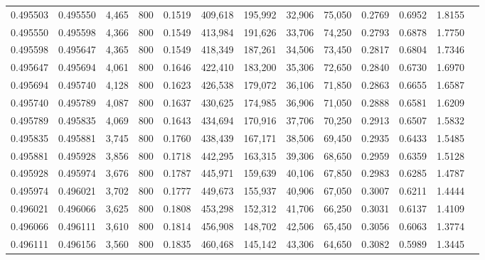 \begin{tabular}{rrrrrrrrrrrrr}
0.495503 & 0.495550 &  4,465 &   800 &                                     0.1519 & 409,618 & 195,992 &  32,906 &  75,050 & 0.2769 & 0.6952 & 1.8155 \\
0.495550 & 0.495598 &  4,366 &   800 &                                     0.1549 & 413,984 & 191,626 &  33,706 &  74,250 & 0.2793 & 0.6878 & 1.7750 \\
0.495598 & 0.495647 &  4,365 &   800 &                                     0.1549 & 418,349 & 187,261 &  34,506 &  73,450 & 0.2817 & 0.6804 & 1.7346 \\
0.495647 & 0.495694 &  4,061 &   800 &                                     0.1646 & 422,410 & 183,200 &  35,306 &  72,650 & 0.2840 & 0.6730 & 1.6970 \\
0.495694 & 0.495740 &  4,128 &   800 &                                     0.1623 & 426,538 & 179,072 &  36,106 &  71,850 & 0.2863 & 0.6655 & 1.6587 \\
0.495740 & 0.495789 &  4,087 &   800 &                                     0.1637 & 430,625 & 174,985 &  36,906 &  71,050 & 0.2888 & 0.6581 & 1.6209 \\
0.495789 & 0.495835 &  4,069 &   800 &                                     0.1643 & 434,694 & 170,916 &  37,706 &  70,250 & 0.2913 & 0.6507 & 1.5832 \\
0.495835 & 0.495881 &  3,745 &   800 &                                     0.1760 & 438,439 & 167,171 &  38,506 &  69,450 & 0.2935 & 0.6433 & 1.5485 \\
0.495881 & 0.495928 &  3,856 &   800 &                                     0.1718 & 442,295 & 163,315 &  39,306 &  68,650 & 0.2959 & 0.6359 & 1.5128 \\
0.495928 & 0.495974 &  3,676 &   800 &                                     0.1787 & 445,971 & 159,639 &  40,106 &  67,850 & 0.2983 & 0.6285 & 1.4787 \\
0.495974 & 0.496021 &  3,702 &   800 &                                     0.1777 & 449,673 & 155,937 &  40,906 &  67,050 & 0.3007 & 0.6211 & 1.4444 \\
0.496021 & 0.496066 &  3,625 &   800 &                                     0.1808 & 453,298 & 152,312 &  41,706 &  66,250 & 0.3031 & 0.6137 & 1.4109 \\
0.496066 & 0.496111 &  3,610 &   800 &                                     0.1814 & 456,908 & 148,702 &  42,506 &  65,450 & 0.3056 & 0.6063 & 1.3774 \\
0.496111 & 0.496156 &  3,560 &   800 &                                     0.1835 & 460,468 & 145,142 &  43,306 &  64,650 & 0.3082 & 0.5989 & 1.3445 \\

\end{tabular}
